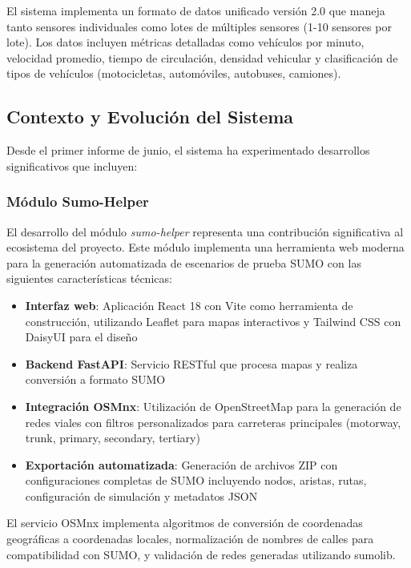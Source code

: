 \documentclass[onecolumn]{article}
\begin{document}
El sistema implementa un formato de datos unificado versión 2.0 que maneja tanto sensores individuales como lotes de múltiples sensores (1-10 sensores por lote). Los datos incluyen métricas detalladas como vehículos por minuto, velocidad promedio, tiempo de circulación, densidad vehicular y clasificación de tipos de vehículos (motocicletas, automóviles, autobuses, camiones).

\subsection{Contexto y Evolución del Sistema}

Desde el primer informe de junio, el sistema ha experimentado desarrollos significativos que incluyen:

\subsubsection{Módulo Sumo-Helper}

El desarrollo del módulo \textit{sumo-helper} representa una contribución significativa al ecosistema del proyecto. Este módulo implementa una herramienta web moderna para la generación automatizada de escenarios de prueba SUMO con las siguientes características técnicas:

\begin{itemize}
    \item \textbf{Interfaz web}: Aplicación React 18 con Vite como herramienta de construcción, utilizando Leaflet para mapas interactivos y Tailwind CSS con DaisyUI para el diseño
    \item \textbf{Backend FastAPI}: Servicio RESTful que procesa mapas y realiza conversión a formato SUMO
    \item \textbf{Integración OSMnx}: Utilización de OpenStreetMap para la generación de redes viales con filtros personalizados para carreteras principales (motorway, trunk, primary, secondary, tertiary)
    \item \textbf{Exportación automatizada}: Generación de archivos ZIP con configuraciones completas de SUMO incluyendo nodos, aristas, rutas, configuración de simulación y metadatos JSON
\end{itemize}

El servicio OSMnx implementa algoritmos de conversión de coordenadas geográficas a coordenadas locales, normalización de nombres de calles para compatibilidad con SUMO, y validación de redes generadas utilizando sumolib.
\end{document}
